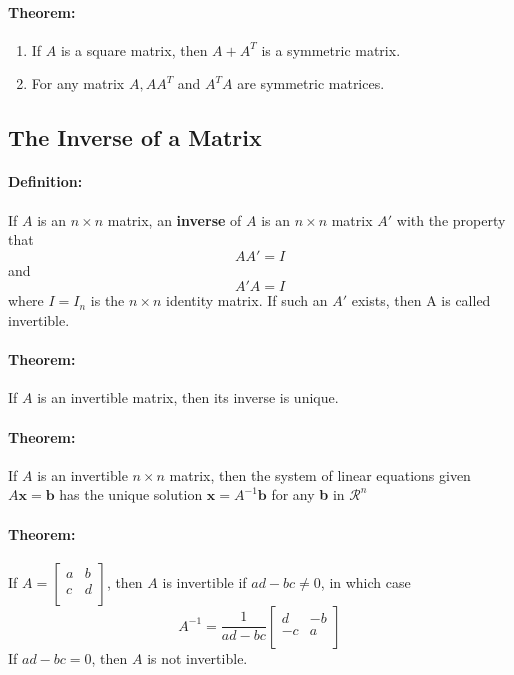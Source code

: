 \documentclass[12pt]{article}
\newenvironment{theorem}{\paragraph{Theorem:\hfill}}{\hfill}
\newenvironment{definition}{\paragraph{Definition: }}{\hfill}
\begin{document}
\begin{theorem}
	\begin{enumerate}
		\item If $A$ is a square matrix, then $A + A^T$ is a symmetric matrix.
		\item For any matrix $A, AA^T$ and $A^TA$ are symmetric matrices.
	\end{enumerate}
\end{theorem}

\subsection{The Inverse of a Matrix}

\begin{definition}
	If $A$ is an $n \times n$ matrix, an \textbf{inverse} of $A$ is an $n \times n$ matrix $A\prime$ with the property that
	\[
		AA\prime = I
	\]
	and
	\[
		A\prime A = I
	\]
	where $I = I_n$ is the $n \times n$ identity matrix. If such an $A \prime$ exists, then A is called invertible.
\end{definition}

\begin{theorem}
	If $A$ is an invertible matrix, then its inverse is unique.
\end{theorem}

\begin{theorem}
	If $A$ is an invertible $n \times n$ matrix, then the system of linear equations given $A\textbf{x} = \textbf{b}$ has the unique solution $\textbf{x} = A^{-1}\textbf{b}$ for any \textbf{b} in $\mathcal{R}^n$
\end{theorem}

\begin{theorem}
	If $A = 
		\begin{bmatrix}
			a & b\\
			c & d\\
		\end{bmatrix}
	$, then $A$ is invertible if $ad - bc \neq 0$, in which case
	\[
		A^{-1} = \frac{1}{ad - bc } 
		\begin{bmatrix}
			d & -b\\
			-c & a\\
		\end{bmatrix}
	\]
	If $ad - bc = 0$, then $A$ is not invertible.
\end{theorem}
\end{document}
